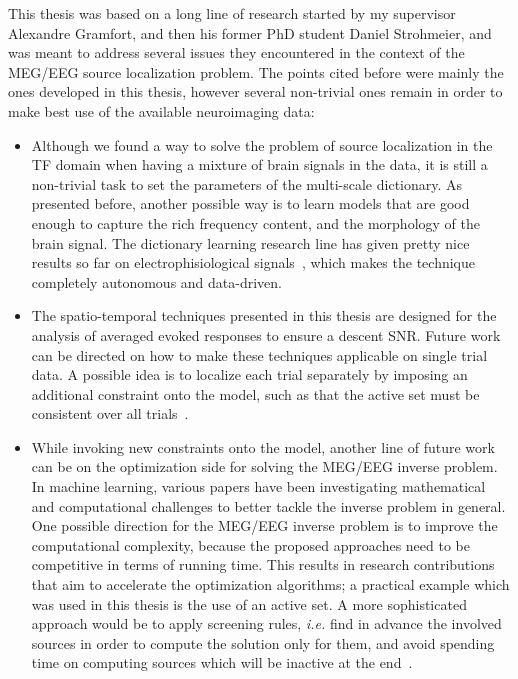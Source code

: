 This thesis was based on a long line of research started by my supervisor Alexandre Gramfort, and then his former PhD student Daniel Strohmeier, and was meant to address several issues they encountered in the context of the MEG/EEG source localization problem. The points cited before were mainly the ones developed in this thesis, however several non-trivial ones remain in order to make best use of the available neuroimaging data:
\begin{itemize}
\item Although we found a way to solve the problem of source localization in the TF domain when having a mixture of brain signals in the data, it is still a non-trivial task to set the parameters of the multi-scale dictionary. As presented before, another possible way is to learn models that are good enough to capture the rich frequency content, and the morphology of the brain signal. The dictionary learning research line has given pretty nice results so far on electrophisiological signals~\cite{jas2017learning,jost2006motif,brockmeier2016learning,hitziger2017adaptive}, which makes the technique completely autonomous and data-driven.

\item The spatio-temporal techniques presented in this thesis are designed for the analysis of averaged evoked responses to ensure a descent SNR. Future work can be directed on how to make these techniques applicable on single trial data. A possible idea is to localize each trial separately by imposing an additional constraint onto the model, such as that the active set must be consistent over all trials~\cite{strohmeier2012meg,strohmeier2012biomag}.

\item While invoking new constraints onto the model, another line of future work can be on the optimization side for solving the MEG/EEG inverse problem. In machine learning, various papers have been investigating mathematical and computational challenges to better tackle the inverse problem in general. One possible direction for the MEG/EEG inverse problem is to improve the computational complexity, because the proposed approaches need to be competitive in terms of running time. This results in research contributions that aim to accelerate the optimization algorithms; a practical example which was used in this thesis is the use of an active set. A more sophisticated approach would be to apply screening rules, \textit{i.e.} find in advance the involved sources in order to compute the solution only for them, and avoid spending time on computing sources which will be inactive at the end~\cite{fercoq-etal:2015,massias2017safe,massiasgap,ndiaye2016gap,ndiaye2017efficient}.


\end{itemize}
